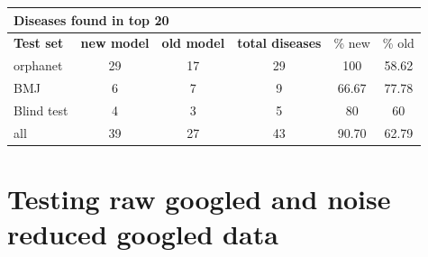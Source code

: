 \documentclass[10pt,letterpaper,final]{article}
\begin{document}
\begin{center}
\begin{small}
\begin{tabular}{l|cc||ccc}
	\multicolumn{6}{l}{\textbf{Diseases found in top 20}} \\ \hline
\textbf{Test set} & \textbf{new model} &	\textbf{old model}	 &	\textbf{total diseases} &	\% new	 &\% old \\ \hline
orphanet &	29 &	17	 &	29 &	100	 & 58.62 \\
BMJ &	6 &	7 &		9 &	66.67 &	77.78 \\
Blind test &	4	 &3	 &	5 &	80	 &60 \\  \hline \hline
all	 &39	 &27 &		43 &	90.70 &	62.79\\ \hline
\end{tabular}
\end{small}
\end{center}

\newpage
\section{Testing raw googled and noise reduced googled data}
\label{app:tests}
\end{document}
